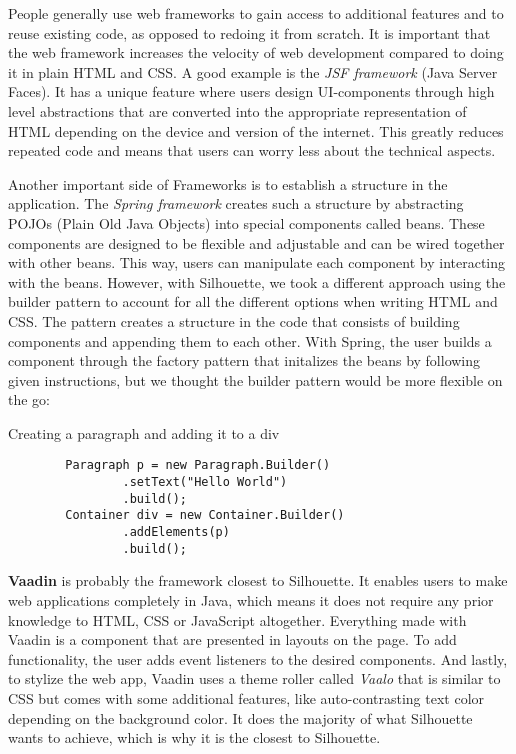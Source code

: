 \documentclass[12pt]{article}
\begin{document}
People generally use web frameworks to gain access to additional features and to reuse existing code, as opposed to redoing it from scratch. It is important that the web framework increases the velocity of web development compared to doing it in plain HTML and CSS. A good example is the \textit{JSF framework} (Java Server Faces). It has a unique feature where users design UI-components through high level abstractions that are converted into the appropriate representation of HTML depending on the device and version of the internet. This greatly reduces repeated code and means that users can worry less about the technical aspects.

Another important side of Frameworks is to establish a structure in the application. The \textit{Spring framework} creates such a structure by abstracting POJOs (Plain Old Java Objects) into special components called beans. These components are designed to be flexible and adjustable and can be wired together with other beans. This way, users can manipulate each component by interacting with the beans. However, with Silhouette, we took a different approach using the builder pattern to account for all the different options when writing HTML and CSS. The pattern creates a structure in the code that consists of building components and appending them to each other. With Spring, the user builds a component through the factory pattern that initalizes the beans by following given instructions, but we thought the builder pattern would be more flexible on the go:

\begin{shaded}
    Creating a paragraph and adding it to a div
    \begin{lstlisting}
        Paragraph p = new Paragraph.Builder()
                .setText("Hello World")
                .build();
        Container div = new Container.Builder()
                .addElements(p)
                .build();
    \end{lstlisting}
\end{shaded}

\textbf{Vaadin} is probably the framework closest to Silhouette. It enables users to make web applications completely in Java, which means it does not require any prior knowledge to HTML, CSS or JavaScript altogether. Everything made with Vaadin is a component that are presented in layouts on the page. To add functionality, the user adds event listeners to the desired components. And lastly, to stylize the web app, Vaadin uses a theme roller called \textit{Vaalo} that is similar to CSS but comes with some additional features, like auto-contrasting text color depending on the background color. It does the majority of what Silhouette wants to achieve, which is why it is the closest to Silhouette.
\end{document}
